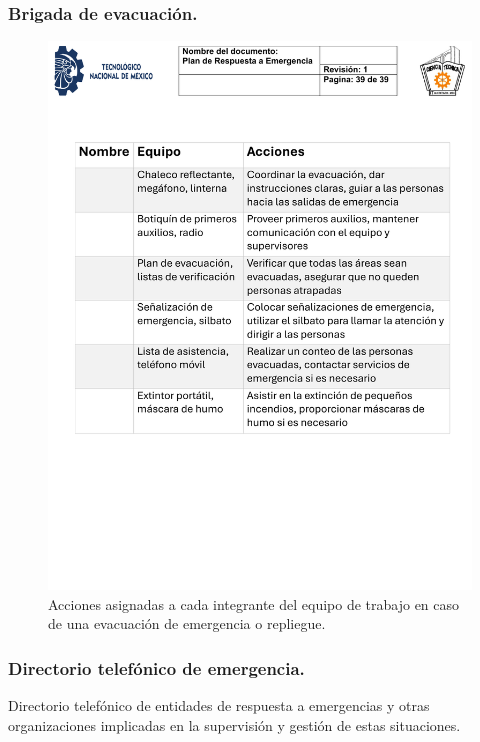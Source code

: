 \subsubsection{Brigada de evacuación.}
% 
\begin{figure}[H]
    \centering
    \includegraphics[scale=0.4]{15/img/tablaBrigadaEvacuacion.pdf}
    \caption{Acciones asignadas a cada integrante del equipo de trabajo en caso de una evacuación de emergencia o repliegue.}
    \label{fig:brigada}
\end{figure}
%
\subsubsection{Directorio telefónico de emergencia.}
% 
Directorio telefónico de entidades de respuesta a emergencias y otras organizaciones implicadas en la supervisión y gestión de estas situaciones.

